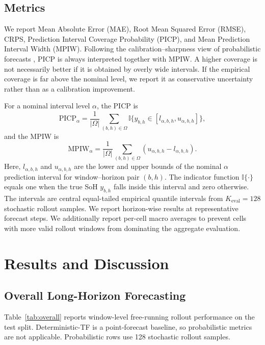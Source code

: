 \documentclass[conference]{IEEEtran}
\begin{document}
\subsection{Metrics}

We report Mean Absolute Error (MAE), Root Mean Squared Error (RMSE), CRPS,
Prediction Interval Coverage Probability
(PICP), and Mean Prediction Interval Width (MPIW). Following the
calibration--sharpness view of probabilistic forecasts
\cite{gneiting2007calibration}, PICP is always interpreted together with
MPIW. A higher coverage is not necessarily better if it is obtained by overly
wide intervals. If the empirical coverage is far above the nominal level, we
report it as conservative uncertainty rather than as a calibration improvement.

For a nominal interval level $\alpha$, the PICP is
\begin{equation}
\mathrm{PICP}_{\alpha}
=
\frac{1}{|\Omega|}
\sum_{(b,h)\in\Omega}
\mathbb{I}\{y_{b,h} \in [l_{\alpha,b,h},u_{\alpha,b,h}]\},
\end{equation}
and the MPIW is
\begin{equation}
\mathrm{MPIW}_{\alpha}
=
\frac{1}{|\Omega|}
\sum_{(b,h)\in\Omega}
(u_{\alpha,b,h}-l_{\alpha,b,h}).
\end{equation}
Here, $l_{\alpha,b,h}$ and $u_{\alpha,b,h}$ are the lower and upper bounds of
the nominal $\alpha$ prediction interval for window--horizon pair $(b,h)$.
The indicator function $\mathbb{I}\{\cdot\}$ equals one when the true SoH
$y_{b,h}$ falls inside this interval and zero otherwise.
The intervals are central equal-tailed empirical quantile intervals from
$K_{\mathrm{eval}}=128$ stochastic rollout samples. We report horizon-wise
results at representative forecast steps. We additionally report per-cell
macro averages to prevent cells with more valid rollout windows from
dominating the aggregate evaluation.

\section{Results and Discussion}

\subsection{Overall Long-Horizon Forecasting}

Table~\ref{tab:overall} reports window-level free-running rollout performance
on the test split. Deterministic-TF is a point-forecast baseline, so
probabilistic metrics are not applicable. Probabilistic rows use 128 stochastic
rollout samples.
\end{document}
